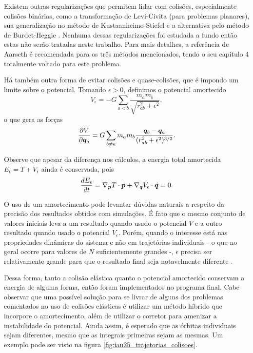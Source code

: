 Existem outras regularizações que permitem lidar com colisões, especialmente colisões binárias, como a transformação de Levi-Civita (para problemas planares), sua generalização no método de Kustaanheimo-Stiefel e a alternativa pelo método de Burdet-Heggie \citep{aarseth_gravitational_2003}. Nenhuma dessas regularizações foi estudada a fundo então estas não serão tratadas neste trabalho. Para mais detalhes, a referência de Aarseth é recomendada para os três métodos mencionados, tendo o seu capítulo 4 totalmente voltado para este problema.

Há também outra forma de evitar colisões e quase-colisões, que é impondo um limite sobre o potencial. Tomando $\epsilon > 0$, definimos o potencial amortecido
\begin{equation}
    V_\epsilon = - G \sum_{a < b} \dfrac{m_a m_b}{\sqrt{r_{ab}^2 + \epsilon^2}},
\end{equation}
o que gera as forças
\begin{equation}
    \dfrac{\partial V}{\partial \bm q_a} = G \sum_{b \neq a} m_a m_b \dfrac{\bm q_b - \bm q_a}{(r_{ab}^2 + \epsilon^2)^{3/2}}.
\end{equation}

Observe que apesar da diferença nos cálculos, a energia total amortecida $E_\epsilon = T + V_\epsilon$ ainda é conservada, pois
\begin{equation*}
    \dfrac{d E_\epsilon}{d t} 
    = \nabla_{\bm p} T \cdot \dot {\bm p} + \nabla_{\bm q} V_\epsilon \cdot \dot {\bm q}
    = 0.
\end{equation*}

O uso de um amortecimento pode levantar dúvidas naturais a respeito da precisão dos resultados obtidos com simulações. É fato que o mesmo conjunto de valores iniciais leva a um resultado quando usado o potencial $V$ e a outro resultado quando usado o potencial $V_\epsilon$. Porém, quando o interesse está nas propriedades dinâmicas do sistema e não em trajetórias individuais - o que no geral ocorre para valores de $N$ suficientemente grandes -, $\epsilon$ precisa ser relativamente grande para que o resultado final seja notavelmente diferente \citep[235]{aarseth_gravitational_2003}.

Dessa forma, tanto a colisão elástica quanto o potencial amortecido conservam a energia de alguma forma, então foram implementados no programa final. Cabe observar que uma possível solução para se livrar de alguns dos problemas comentados no uso de colisões elásticas é utilizar um método híbrido que incorpore o amortecimento, além de utilizar o corretor para amenizar a instabilidade do potencial. Ainda assim, é esperado que as órbitas individuais sejam diferentes, mesmo que as integrais primeiras sejam as mesmas. Um exemplo pode ser visto na figura \ref{fig:iau25_trajetorias_colisoes}.

